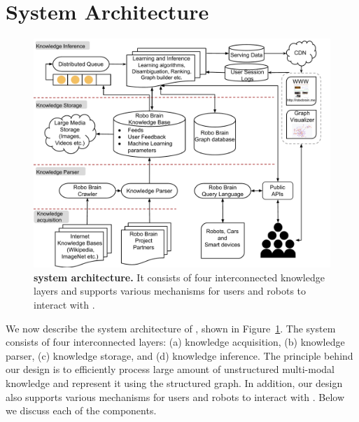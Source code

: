 \section{System Architecture}
\label{sec:system}
\begin{figure}[t]
\centering
\includegraphics[width=\linewidth]{Image/RoboBrain_Systems}
\caption{\textbf{\robobrain{} system architecture.} It consists of four
interconnected knowledge layers and supports various mechanisms for users and
robots to interact with \robobrain{}.}
\label{fig:system}
\end{figure}


We now describe the system architecture of \robobrain{}, shown in Figure~\ref{fig:system}. The system
consists of four interconnected layers: (a) knowledge acquisition, (b) knowledge
parser, (c) knowledge storage,  and (d) knowledge inference. The principle
behind our design is to efficiently process large amount of unstructured
multi-modal knowledge and represent it using the structured \mbox{\robobrain{}} graph.
In addition, our design also supports various mechanisms for users and robots to interact with \robobrain{}. %
Below we discuss each of the components.


